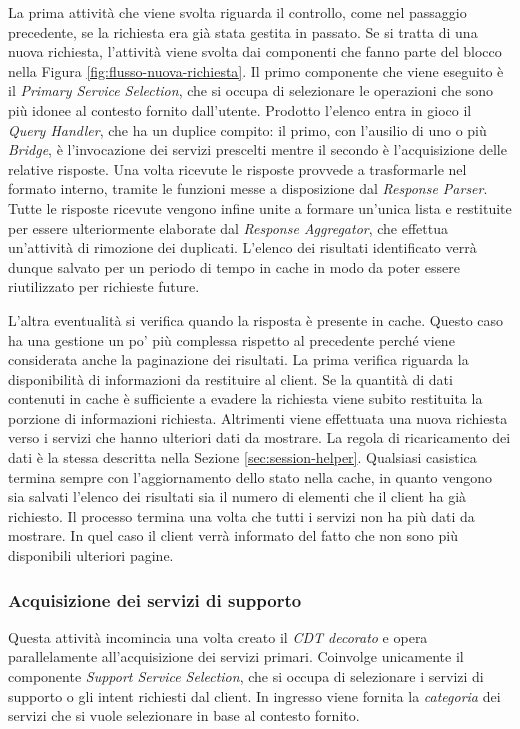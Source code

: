 La prima attività che viene svolta riguarda il controllo, come nel passaggio precedente, se la richiesta era già stata gestita in passato. Se si tratta di una nuova richiesta, l'attività viene svolta dai componenti che fanno parte del blocco  nella Figura \ref{fig:flusso-nuova-richiesta}. Il primo componente che viene eseguito è il \emph{Primary Service Selection}, che si occupa di selezionare le operazioni che sono più idonee al contesto fornito dall'utente. Prodotto l'elenco entra in gioco il \emph{Query Handler}, che ha un duplice compito: il primo, con l'ausilio di uno o più \emph{Bridge}, è l'invocazione dei servizi prescelti mentre il secondo è l'acquisizione delle relative risposte. Una volta ricevute le risposte provvede a trasformarle nel formato interno, tramite le funzioni messe a disposizione dal \emph{Response Parser}. Tutte le risposte ricevute vengono infine unite a formare un'unica lista e restituite per essere ulteriormente elaborate dal \emph{Response Aggregator}, che effettua un'attività di rimozione dei duplicati. L'elenco dei risultati identificato verrà dunque salvato per un periodo di tempo in cache in modo da poter essere riutilizzato per richieste future.

L'altra eventualità si verifica quando la risposta è presente in cache. Questo caso ha una gestione un po' più complessa rispetto al precedente perché viene considerata anche la paginazione dei risultati. La prima verifica riguarda la disponibilità di informazioni da restituire al client. Se la quantità di dati contenuti in cache è sufficiente a evadere la richiesta viene subito restituita la porzione di informazioni richiesta. Altrimenti viene effettuata una nuova richiesta verso i servizi che hanno ulteriori dati da mostrare. La regola di ricaricamento dei dati è la stessa descritta nella Sezione \ref{sec:session-helper}. Qualsiasi casistica termina sempre con l'aggiornamento dello stato nella cache, in quanto vengono sia salvati l'elenco dei risultati sia il numero di elementi che il client ha già richiesto. Il processo termina una volta che tutti i servizi non ha più dati da mostrare. In quel caso il client verrà informato del fatto che non sono più disponibili ulteriori pagine.

\subsubsection*{Acquisizione dei servizi di supporto}

Questa attività incomincia una volta creato il \emph{CDT decorato} e opera parallelamente all'acquisizione dei servizi primari. Coinvolge unicamente il componente \emph{Support Service Selection}, che si occupa di selezionare i servizi di supporto o gli intent richiesti dal client. In ingresso viene fornita la \emph{categoria} dei servizi che si vuole selezionare in base al contesto fornito.

